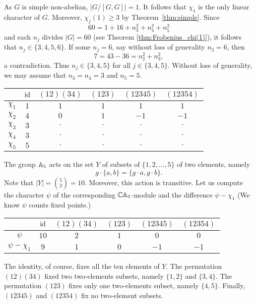As $G$ is simple non-abelian, 
$|G/[G,G]|=1$. It follows that
$\chi_1$ is the only linear character of $G$. Moreover, 
$\chi_j(1)\geq3$ by Theorem~\ref{thm:simple}. Since 
\[
60=1+16+n_3^2+n_4^2+n_5^2
\]
and each $n_j$ divides $|G|=60$ 
(see Theorem \ref{thm:Frobenius_chi(1)}), it follows that 
$n_j\in\{3,4,5,6\}$. If some $n_j=6$, say without
loss of generality $n_3=6$, then 
\[
7=43-36=n_2^2+n_3^2, 
\]
a contradiction. Thus $n_j\in\{3,4,5\}$ for 
all $j\in\{3,4,5\}$. Without loss of generality, 
we may assume that $n_3=n_4=3$ and $n_5=5$. 

\bigskip 
\begin{center}
        \begin{tabular}{|c|ccccc|}
        \hline  
         & $\operatorname{id}$ & $(12)(34)$ & $(123)$ & $(12345)$ & $(12354)$\\
        \hline 
        $\chi_1$ & $1$ & $1$ & $1$ & $1$ & $1$\\
        $\chi_2$ & $4$ & $0$ & $1$ & $-1$ & $-1$\\
        $\chi_3$ & $3$ & $\cdot$ & $\cdot$ & $\cdot$& $\cdot$\\
        $\chi_4$ & $3$ & $\cdot$ & $\cdot$ & $\cdot$& $\cdot$\\
        $\chi_5$ & $5$ & $\cdot$ & $\cdot$ & $\cdot$& $\cdot$\\
        \hline 
    \end{tabular}
\end{center}
\bigskip 

The group $\mathbb{A}_5$ acts on the set $Y$ of subsets 
of $\{1,2,\dots,5\}$ of two elements, namely
\[
g\cdot \{a,b\}=\{g\cdot a,g\cdot b\}.
\]
Note that $|Y|=\binom{5}{2}=10$. Moreover, 
this action is transitive. Let us compute 
the character $\psi$ of the corresponding 
$\mathbb{C}\mathbb{A}_5$-module and the difference 
$\psi-\chi_1$ (We know $\psi$ counts
fixed points.)

\bigskip 
\begin{center}
        \begin{tabular}{|c|ccccc|}
        \hline  
         & $\operatorname{id}$ & $(12)(34)$ & $(123)$ & $(12345)$ & $(12354)$\\
        \hline 
        $\psi$ & $10$ & $2$ & $1$ & $0$ & $0$\\
        $\psi-\chi_1$ & $9$ & $1$ & $0$ & $-1$ & $-1$\\
        \hline 
    \end{tabular}
\end{center}
\bigskip 

The identity, of course, fixes all the ten elements
of $Y$. The permutation 
$(12)(34)$ fixed two two-elements subsets, namely
$\{1,2\}$ and $\{3,4\}$. The permutation 
$(123)$ fixes only one two-elements subset, namely
$\{4,5\}$. Finally, $(12345)$ and 
$(12354)$ fix no two-element subsets. 

